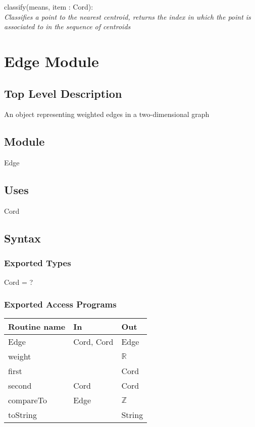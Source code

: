 \documentclass[12pt]{article}
\begin{document}
\noindent
classify(means, item : Cord):\\
\textit{Classifies a point to the nearest centroid, returns the index in which the
point is associated to in the sequence of centroids}

\newpage

\section*{Edge Module}

\subsection* {Top Level Description}

An object representing weighted edges in a two-dimensional graph

\subsection*{Module}

Edge

\subsection* {Uses}

Cord

\subsection* {Syntax}

\subsubsection* {Exported Types}

Cord = ?

\subsubsection* {Exported Access Programs}

\begin{tabular}{| l | l | l |}
\hline
\textbf{Routine name} & \textbf{In} & \textbf{Out}\\
\hline
Edge & Cord, Cord & Edge\\
\hline
weight & ~ & $\mathbb{R}$\\
\hline
first & ~ & Cord \\
\hline
second & Cord & Cord\\
\hline
compareTo & Edge & $\mathbb{Z}$\\
\hline
toString & ~ & String\\
\hline
\end{tabular}
\end{document}
